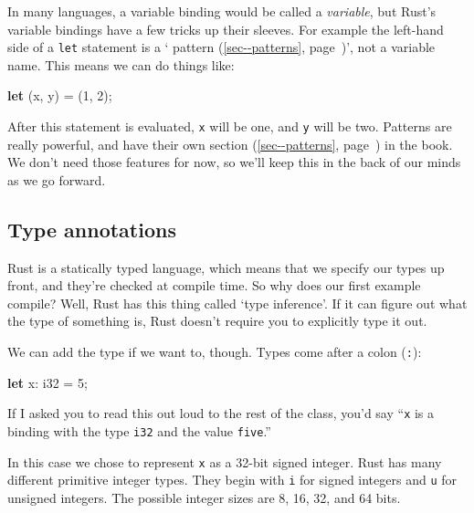 \documentclass[a4paper,]{book}
\renewcommand*{\hyperlink}[2]{%
 #2 (\autoref{#1}, page~\pageref{#1})}
\newenvironment{Shaded}{\begin{snugshade}}{\end{snugshade}}
\newcommand{\KeywordTok}[1]{\textcolor[rgb]{0.13,0.29,0.53}{\textbf{{#1}}}}
\newcommand{\DataTypeTok}[1]{\textcolor[rgb]{0.13,0.29,0.53}{{#1}}}
\newcommand{\DecValTok}[1]{\textcolor[rgb]{0.00,0.00,0.81}{{#1}}}
\newcommand{\NormalTok}[1]{{#1}}
\begin{document}
In many languages, a variable binding would be called a \emph{variable},
but Rust's variable bindings have a few tricks up their sleeves. For
example the left-hand side of a \texttt{let} statement is a
`\protect\hyperlink{sec--patterns}{pattern}', not a variable name. This
means we can do things like:

\begin{Shaded}
\begin{Highlighting}[]
\KeywordTok{let} \NormalTok{(x, y) = (}\DecValTok{1}\NormalTok{, }\DecValTok{2}\NormalTok{);}
\end{Highlighting}
\end{Shaded}

After this statement is evaluated, \texttt{x} will be one, and
\texttt{y} will be two. Patterns are really powerful, and have
\protect\hyperlink{sec--patterns}{their own section} in the book. We
don't need those features for now, so we'll keep this in the back of our
minds as we go forward.

\subsection{Type annotations}\label{type-annotations}

Rust is a statically typed language, which means that we specify our
types up front, and they're checked at compile time. So why does our
first example compile? Well, Rust has this thing called `type
inference'. If it can figure out what the type of something is, Rust
doesn't require you to explicitly type it out.

We can add the type if we want to, though. Types come after a colon
(\texttt{:}):

\begin{Shaded}
\begin{Highlighting}[]
\KeywordTok{let} \NormalTok{x: }\DataTypeTok{i32} \NormalTok{= }\DecValTok{5}\NormalTok{;}
\end{Highlighting}
\end{Shaded}

If I asked you to read this out loud to the rest of the class, you'd say
``\texttt{x} is a binding with the type \texttt{i32} and the value
\texttt{five}.''

In this case we chose to represent \texttt{x} as a 32-bit signed
integer. Rust has many different primitive integer types. They begin
with \texttt{i} for signed integers and \texttt{u} for unsigned
integers. The possible integer sizes are 8, 16, 32, and 64 bits.
\end{document}
